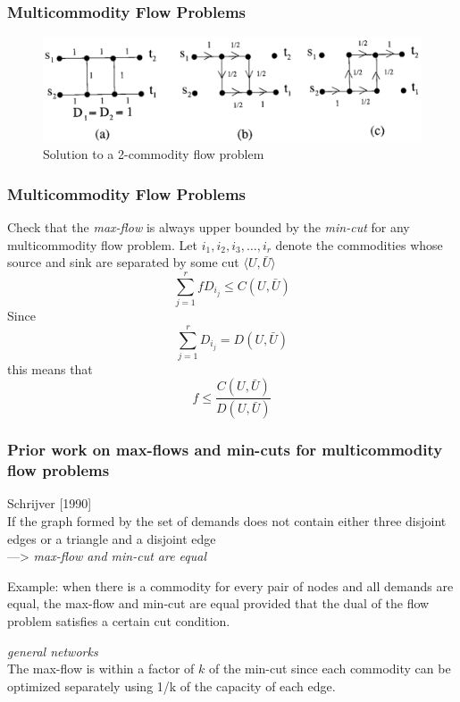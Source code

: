 \begin{frame}[c]
\frametitle{Multicommodity Flow Problems}
	\begin{figure}
		\centering
		\includegraphics[width=\textwidth]{figs/2-commodity_flow_problem.png}
		\caption{Solution to a 2-commodity flow problem}
	\end{figure}
\end{frame}


\begin{frame}
\frametitle{Multicommodity Flow Problems}
Check that the \textit{max-flow} is always upper bounded by the \textit{min-cut} for any multicommodity flow problem. Let $i_1,i_2,i_3,\dots,i_r$ denote the commodities  whose source and sink are separated by some cut $\langle U, \bar{U} \rangle$
$$	\sum_{j=1}^{r} fD_{i_{j}} \le C(U, \bar{U})	$$
Since
$$	\sum_{j=1}^{r} D_{i_{j}} = D(U, \bar{U})	$$
this means that
$$	f \le \frac{C(U, \bar{U})}{D(U, \bar{U})}	$$
\end{frame}


\begin{frame}
\frametitle{Prior work on max-flows and min-cuts for multicommodity flow problems}
Schrijver [1990]\\
If the graph formed by the set of demands does not contain either three disjoint edges or a triangle and a disjoint edge\\
\quad ---> \quad \textit{max-flow and min-cut are equal}

Example: when there is a commodity for every pair of nodes and all demands are equal, the max-flow and min-cut are equal provided that the dual of the flow problem satisfies a certain cut condition.

\textit{general networks}\\  
The max-flow is within a factor of $k$ of the min-cut since each commodity can be optimized separately using 1/k of the capacity of each edge.
\end{frame}

